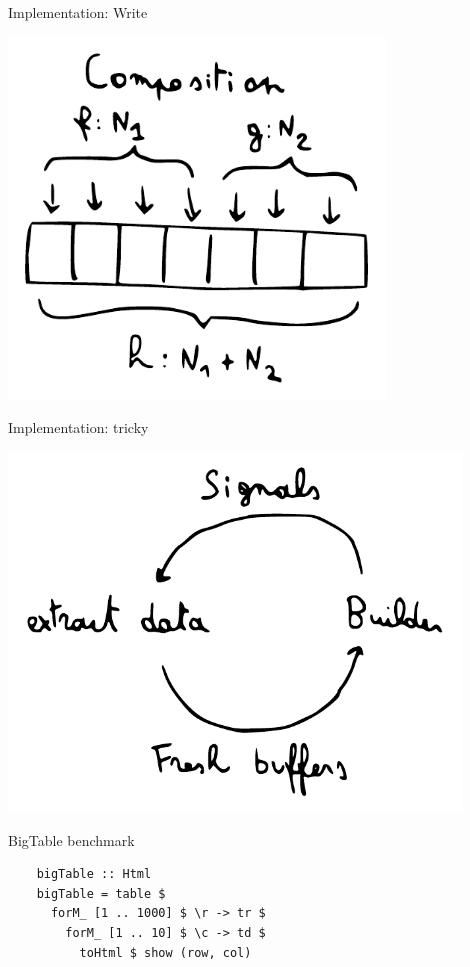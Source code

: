 \documentclass[20pt]{beamer}
\newcommand{\vspaced}{
    \vspace{5mm}
}
\begin{document}
\begin{frame}{Implementation: Write}
    \begin{center}
    \includegraphics[width=0.75\textwidth]{images/composition.pdf}
    \end{center}
\end{frame}

\begin{frame}{Implementation: tricky}
    \begin{center}
    \includegraphics[width=0.9\textwidth]{images/builder.pdf}
    \end{center}
\end{frame}

\begin{frame}[fragile, b]{BigTable benchmark}
    \begin{lstlisting}
    bigTable :: Html
    bigTable = table $
      forM_ [1 .. 1000] $ \r -> tr $
        forM_ [1 .. 10] $ \c -> td $
          toHtml $ show (row, col)
    \end{lstlisting}
    \vspaced
\end{frame}
\end{document}
